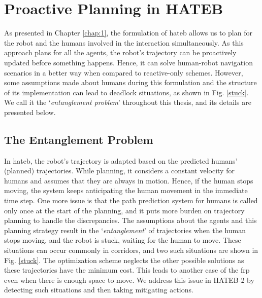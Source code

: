 
\section{Proactive Planning in HATEB}
\label{proactive_planning}
As presented in Chapter \ref{chap:1}, the formulation of \acrshort{hateb} allows us to plan for the robot and the humans involved in the interaction simultaneously. As this approach plans for all the agents, the robot's trajectory can be proactively updated before something happens. Hence, it can solve human-robot navigation scenarios in a better way when compared to reactive-only schemes. However, some assumptions made about humans during this formulation and the structure of its implementation can lead to deadlock situations, as shown in Fig. \ref{stuck}. We call it the `\textit{entanglement problem}' throughout this thesis, and its details are presented below.

\subsection{The Entanglement Problem}
In \acrshort{hateb}, the robot's trajectory is adapted based on the predicted humans' (planned) trajectories. While planning, it considers a constant velocity for humans and assumes that they are always in motion. Hence, if the human stops moving, the system keeps anticipating the human movement in the immediate time step. One more issue is that the path prediction system for humans is called only once at the start of the planning, and it puts more burden on trajectory planning to handle the discrepancies. The assumptions about the agents and this planning strategy result in the `\textit{entanglement}' of trajectories when the human stops moving, and the robot is stuck, waiting for the human to move. These situations can occur commonly in corridors, and two such situations are shown in Fig.  \ref{stuck}. The optimization scheme neglects the other possible solutions as these trajectories have the minimum cost. This leads to another case of the \acrfull{frp} even when there is enough space to move. We address this issue in HATEB-2 by detecting such situations and then taking mitigating actions.

